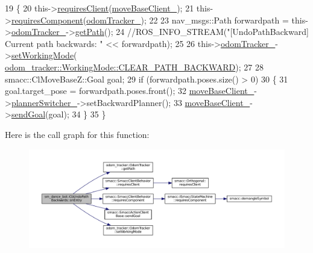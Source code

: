 \begin{DoxyCode}
19   \{
20     this->\hyperlink{classsmacc_1_1SmaccClientBehavior_adc21bbd45d36bd81ca6f778ed161807a}{requiresClient}(\hyperlink{classsm__dance__bot_1_1CbUndoPathBackwards_a2e134a879373ea9d29d04f72f707cbc8}{moveBaseClient\_});
21     this->\hyperlink{classsmacc_1_1SmaccClientBehavior_a011246bb1424f8bf8c9322f652db9d88}{requiresComponent}(\hyperlink{classsm__dance__bot_1_1CbUndoPathBackwards_a75335993a9cd613c7aba93ccb518c645}{odomTracker\_});
22 
23     nav\_msgs::Path forwardpath = this->\hyperlink{classsm__dance__bot_1_1CbUndoPathBackwards_a75335993a9cd613c7aba93ccb518c645}{odomTracker\_}->\hyperlink{classodom__tracker_1_1OdomTracker_a33cb7ab3947b27bf61fabb5be2dd87c9}{getPath}();
24     \textcolor{comment}{//ROS\_INFO\_STREAM("[UndoPathBackward] Current path backwards: " << forwardpath);}
25 
26     this->\hyperlink{classsm__dance__bot_1_1CbUndoPathBackwards_a75335993a9cd613c7aba93ccb518c645}{odomTracker\_}->\hyperlink{classodom__tracker_1_1OdomTracker_ac001a40d1107ef0d88aa7db03cafb08c}{setWorkingMode}(
      \hyperlink{namespaceodom__tracker_a4daf27fd157b1a481fdfd6f90de00b88a0cf8f27617189e35619df3c18bda6274}{odom\_tracker::WorkingMode::CLEAR\_PATH\_BACKWARD});
27 
28     smacc::ClMoveBaseZ::Goal goal;
29     \textcolor{keywordflow}{if} (forwardpath.poses.size() > 0)
30     \{
31       goal.target\_pose = forwardpath.poses.front();
32       \hyperlink{classsm__dance__bot_1_1CbUndoPathBackwards_a2e134a879373ea9d29d04f72f707cbc8}{moveBaseClient\_}->\hyperlink{classsmacc_1_1ClMoveBaseZ_a712e0df77c9629930e03cbb4c539b485}{plannerSwitcher\_}->setBackwardPlanner();
33       \hyperlink{classsm__dance__bot_1_1CbUndoPathBackwards_a2e134a879373ea9d29d04f72f707cbc8}{moveBaseClient\_}->\hyperlink{classsmacc_1_1SmaccActionClientBase_a58c67a87c5fb8ea1633573c58fe3eee1}{sendGoal}(goal);
34     \}
35   \}
\end{DoxyCode}


Here is the call graph for this function\+:
\nopagebreak
\begin{figure}[H]
\begin{center}
\leavevmode
\includegraphics[width=350pt]{classsm__dance__bot_1_1CbUndoPathBackwards_a5ecdf83df96ab3d74eb4e4febea7fa74_cgraph}
\end{center}
\end{figure}




